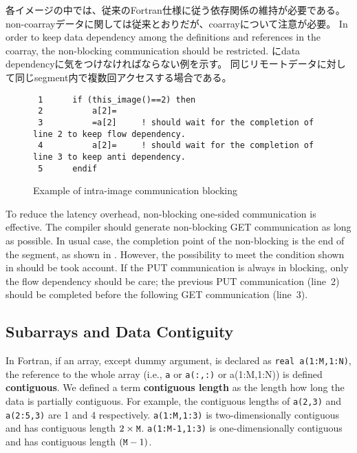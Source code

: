 各イメージの中では、従来のFortran仕様に従う依存関係の維持が必要である。
non-coarrayデータに関しては従来とおりだが、coarrayについて注意が必要。
In order to keep data dependency among the definitions and 
references in the coarray, the non-blocking communication should be restricted.
 にdata dependencyに気をつけなければならない例を示す。
同じリモートデータに対して同じsegment内で複数回アクセスする場合である。

\begin{figure}[hbt]
 \begin{center}
\begin{verbatim}
 1      if (this_image()==2) then
 2          a[2]=
 3          =a[2]     ! should wait for the completion of line 2 to keep flow dependency.
 4          a[2]=     ! should wait for the completion of line 3 to keep anti dependency.
 5      endif

\end{verbatim}
  \caption{Example of intra-image communication blocking}
  \label{fig:block-ex}
 \end{center}
\end{figure}


\requirement
To reduce the latency overhead, non-blocking one-sided communication is effective.
The compiler should generate non-blocking GET communication as long as possible.
In usual case, the completion point of the non-blocking is the end of the segment, as
shown in .  However, the possibility to meet the condition shown in
 should be took account. If the PUT communication is always in blocking, 
only the flow dependency should be care; the previous PUT communication (line~2) 
should be completed before the following GET communication (line~3).

\subsection{Subarrays and Data Contiguity}\label{sec:spec-contig}

In Fortran, if an array, except dummy argument, is declared as {\tt real a(1:M,1:N)}, 
the reference to the whole array (i.e., {\tt a} or {\tt a(:,:)} or {a(1:M,1:N)})
is defined {\bf contiguous}. 
We defined a term {\bf contiguous length} as the length how long the data is partially
contiguous. For example, the contiguous lengths of {\tt a(2,3)} and {\tt a(2:5,3)} are
1 and 4 respectively.  {\tt a(1:M,1:3)} is two-dimensionally contiguous and has 
contiguous length $2 \times {\tt M}$.
{\tt a(1:M-1,1:3)} is one-dimensionally contiguous and has 
contiguous length $({\tt M} - 1)$.


